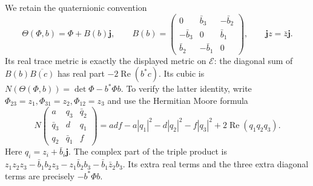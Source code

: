 We retain the quaternionic convention
\[
 \Theta(\Phi,b)=\Phi+B(b)\mathbf j,\qquad
 B(b)=\begin{pmatrix}
 0&\bar b_3&-\bar b_2\\-\bar b_3&0&\bar b_1\\
 \bar b_2&-\bar b_1&0
 \end{pmatrix},\qquad \mathbf j z=\bar z\mathbf j .
\]
Its real trace metric is exactly the displayed metric on \(\mathcal E\):
the diagonal sum of \(B(b)\overline{B(c)}\) has real part
\(-2\operatorname{Re}(b^*c)\). Its cubic is
\(N(\Theta(\Phi,b))=\det\Phi-b^*\Phi b\). To verify the latter identity,
write \(\Phi_{23}=z_1,\Phi_{31}=z_2,\Phi_{12}=z_3\) and use the
Hermitian Moore formula
\[
 N\begin{pmatrix}a&q_3&\bar q_2\\\bar q_3&d&q_1\\q_2&\bar q_1&f\end{pmatrix}
 =adf-a|q_1|^2-d|q_2|^2-f|q_3|^2
                 +2\operatorname{Re}(q_1q_2q_3).
\]
Here \(q_i=z_i+\bar b_i\mathbf j\). The complex part of the triple
product is
\(z_1z_2z_3-\bar b_1b_2z_3-z_1\bar b_2b_3-\bar b_1\bar z_2b_3\).
Its extra real terms and the three extra diagonal terms are precisely
\(-b^*\Phi b\).

